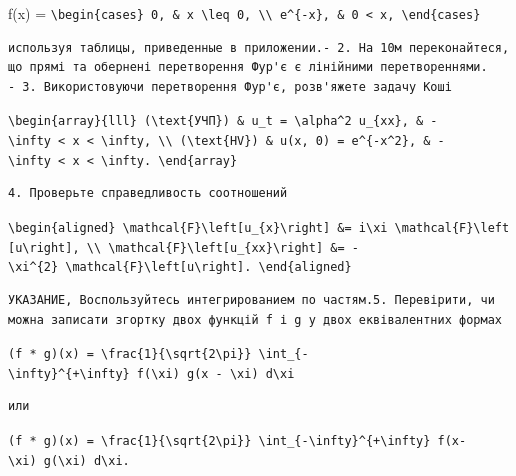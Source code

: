 \documentclass[
  ukrainian,
]{article}
\begin{document}
f(x) =
\texttt{\textbackslash{}begin\{cases\}\ 0,\ \&\ x\ \textbackslash{}leq\ 0,\ \textbackslash{}\textbackslash{}\ e\^{}\{-x\},\ \&\ 0\ \textless{}\ x,\ \textbackslash{}end\{cases\}}

\begin{verbatim}
используя таблицы, приведенные в приложении.- 2. На 10м переконайтеся, що прямі та обернені перетворення Фур'є є лінійними перетвореннями.
- 3. Використовуючи перетворення Фур'є, розв'яжете задачу Коші
\end{verbatim}

\texttt{\textbackslash{}begin\{array\}\{lll\}\ (\textbackslash{}text\{УЧП\})\ \&\ u\_t\ =\ \textbackslash{}alpha\^{}2\ u\_\{xx\},\ \&\ -\textbackslash{}infty\ \textless{}\ x\ \textless{}\ \textbackslash{}infty,\ \textbackslash{}\textbackslash{}\ (\textbackslash{}text\{HV\})\ \&\ u(x,\ 0)\ =\ e\^{}\{-x\^{}2\},\ \&\ -\textbackslash{}infty\ \textless{}\ x\ \textless{}\ \textbackslash{}infty.\ \textbackslash{}end\{array\}}

\begin{verbatim}
4. Проверьте справедливость соотношений
\end{verbatim}

\texttt{\textbackslash{}begin\{aligned\}\ \textbackslash{}mathcal\{F\}\textbackslash{}left{[}u\_\{x\}\textbackslash{}right{]}\ \&=\ i\textbackslash{}xi\ \textbackslash{}mathcal\{F\}\textbackslash{}left{[}u\textbackslash{}right{]},\ \textbackslash{}\textbackslash{}\ \textbackslash{}mathcal\{F\}\textbackslash{}left{[}u\_\{xx\}\textbackslash{}right{]}\ \&=\ -\textbackslash{}xi\^{}\{2\}\ \textbackslash{}mathcal\{F\}\textbackslash{}left{[}u\textbackslash{}right{]}.\ \textbackslash{}end\{aligned\}}

\begin{verbatim}
УКАЗАНИЕ, Воспользуйтесь интегрированием по частям.5. Перевірити, чи можна записати згортку двох функцій f і g у двох еквівалентних формах
\end{verbatim}

\texttt{(f\ *\ g)(x)\ =\ \textbackslash{}frac\{1\}\{\textbackslash{}sqrt\{2\textbackslash{}pi\}\}\ \textbackslash{}int\_\{-\textbackslash{}infty\}\^{}\{+\textbackslash{}infty\}\ f(\textbackslash{}xi)\ g(x\ -\ \textbackslash{}xi)\ d\textbackslash{}xi}

\begin{verbatim}
или
\end{verbatim}

\texttt{(f\ *\ g)(x)\ =\ \textbackslash{}frac\{1\}\{\textbackslash{}sqrt\{2\textbackslash{}pi\}\}\ \textbackslash{}int\_\{-\textbackslash{}infty\}\^{}\{+\textbackslash{}infty\}\ f(x-\textbackslash{}xi)\ g(\textbackslash{}xi)\ d\textbackslash{}xi.}
\end{document}
